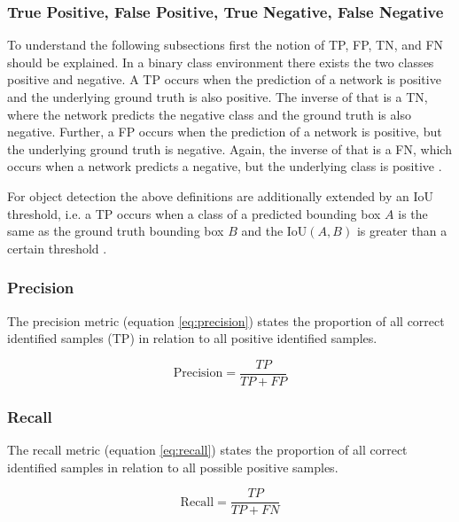
\subsubsection{True Positive, False Positive, True Negative, False Negative}
\label{sec:tpfpfn}

To understand the following subsections first the notion of \ac{TP}, \ac{FP}, \ac{TN}, and \ac{FN} should be explained.
In a binary class environment there exists the two classes positive and negative.
A \ac{TP} occurs when the prediction of a network is positive and the underlying ground truth is also positive.
The inverse of that is a \ac{TN}, where the network predicts the negative class and the ground truth is also negative.
Further, a \ac{FP} occurs when the prediction of a network is positive, but the underlying ground truth is negative.
Again, the inverse of that is a \ac{FN}, which occurs when a network predicts a negative, but the underlying class is positive \cite{tpfp}.

For object detection the above definitions are additionally extended by an \ac{IoU} threshold, i.e. a \ac{TP} occurs when a class of a predicted bounding box $A$ is the same as the ground truth bounding box $B$ and the \ac{IoU}$(A, B)$ is greater than a certain threshold \cite{map_coco}.

\subsubsection{Precision}

The precision metric (equation \ref{eq:precision}) states the proportion of all correct identified samples (\ac{TP}) in relation to all positive identified samples.

\begin{equation}
    \text{Precision} = \frac{TP}{TP + FP}
    \label{eq:precision}
\end{equation}

\subsubsection{Recall}

The recall metric (equation \ref{eq:recall}) states the proportion of all correct identified samples in relation to all possible positive samples.

\begin{equation}
    \text{Recall} = \frac{TP}{TP + FN}
    \label{eq:recall}
\end{equation}


